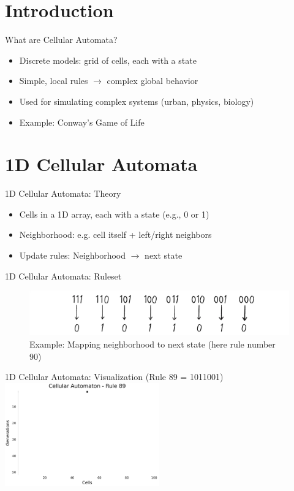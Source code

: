 \section{Introduction}
\begin{frame}{What are Cellular Automata?}
    \begin{itemize}
        \item Discrete models: grid of cells, each with a state
        \item Simple, local rules $\rightarrow$ complex global behavior
        \item Used for simulating complex systems (urban, physics, biology)
        \item Example: Conway's Game of Life
    \end{itemize}
\end{frame}


\section{1D Cellular Automata}
\begin{frame}{1D Cellular Automata: Theory}
    \begin{itemize}
        \item Cells in a 1D array, each with a state (e.g., 0 or 1)
        \item Neighborhood: e.g. cell itself + left/right neighbors
        \item Update rules: Neighborhood $\rightarrow$ next state
    \end{itemize}
\end{frame}

\begin{frame}{1D Cellular Automata: Ruleset}
    \begin{figure}
        \centering
        \includegraphics[width=\textwidth]{../paper/figures/ruleset_example.png}
        \caption{Example: Mapping neighborhood to next state (here rule number 90)}
    \end{figure}
\end{frame}

\begin{frame}{1D Cellular Automata: Visualization (Rule 89 = 1011001)}
    \centering
    \includegraphics[width=0.5\textwidth]{../paper/figures/carule89_step0}
\end{frame}

